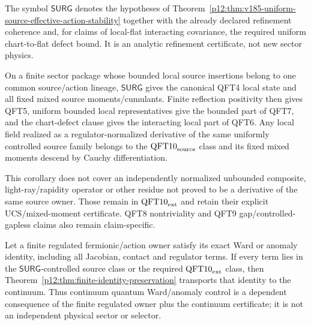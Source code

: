 \documentclass[12pt,a4paper]{article}
\begin{document}
\begin{definition}
\label{p12:def:v236-surg}
The symbol \(\mathsf{SURG}\) denotes the hypotheses of
Theorem~\ref{p12:thm:v185-uniform-source-effective-action-stability} together
with the already declared refinement coherence and, for claims of local-flat
interacting covariance, the required uniform chart-to-flat defect bound.  It
is an analytic refinement certificate, not new sector physics.
\end{definition}

\begin{corollary}
\label{p12:cor:v236-source-owned-continuum}
On a finite sector package whose bounded local source insertions belong to one
common source/action lineage, \(\mathsf{SURG}\) gives the canonical QFT4 local
state and all fixed mixed source moments/cumulants.  Finite reflection
positivity then gives QFT5, uniform bounded local representatives give the
bounded part of QFT7, and the chart-defect clause gives the interacting local
part of QFT6.  Any local field realized as a regulator-normalized derivative
of the same uniformly controlled source family belongs to the
\(\mathrm{QFT10}_{\rm source}\) class and its fixed mixed moments descend by
Cauchy differentiation.

This corollary does not cover an independently normalized unbounded composite,
light-ray/rapidity operator or other residue not proved to be a derivative of
the same source owner.  Those remain in
\(\mathrm{QFT10}_{\rm ext}\) and retain their explicit UCS/mixed-moment
certificate.  QFT8 nontriviality and QFT9 gap/controlled-gapless claims also
remain claim-specific.
\end{corollary}

\begin{corollary}
\label{p12:cor:v236-ward-dependent}
Let a finite regulated fermionic/action owner satisfy its exact Ward or
anomaly identity, including all Jacobian, contact and regulator terms.  If
every term lies in the \(\mathsf{SURG}\)-controlled source class or the
required \(\mathrm{QFT10}_{\rm ext}\) class, then
Theorem~\ref{p12:thm:finite-identity-preservation} transports that identity to
the continuum.  Thus continuum quantum Ward/anomaly control is a dependent
consequence of the finite regulated owner plus the continuum certificate; it
is not an independent physical sector or selector.
\end{corollary}
\end{document}

